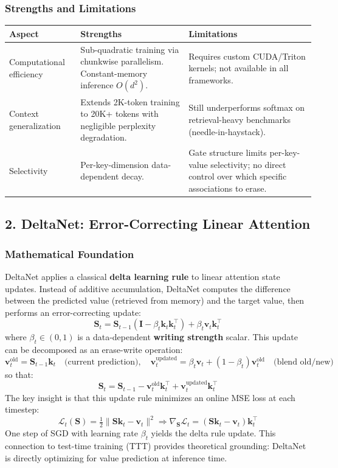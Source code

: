 \documentclass[11pt,a4paper]{article}
\begin{document}
\subsubsection{Strengths and Limitations}

\begin{table}[H]
\centering
\small
\begin{tabularx}{0.95\linewidth}{Xp{4cm}p{4cm}}
\toprule
\textbf{Aspect} & \textbf{Strengths} & \textbf{Limitations} \\
\midrule
Computational efficiency & Sub-quadratic training via chunkwise parallelism. Constant-memory inference $O(d^2)$. & Requires custom CUDA/Triton kernels; not available in all frameworks. \\
Context generalization & Extends 2K-token training to 20K+ tokens with negligible perplexity degradation. & Still underperforms softmax on retrieval-heavy benchmarks (needle-in-haystack). \\
Selectivity & Per-key-dimension data-dependent decay. & Gate structure limits per-key-value selectivity; no direct control over which specific associations to erase. \\
\bottomrule
\end{tabularx}
\end{table}

\subsection{2. DeltaNet: Error-Correcting Linear Attention}

\subsubsection{Mathematical Foundation}

DeltaNet \citep{yang_deltanet_2024} applies a classical \textbf{delta learning rule} to linear attention state updates. Instead of additive accumulation, DeltaNet computes the difference between the predicted value (retrieved from memory) and the target value, then performs an error-correcting update:
\[
\mathbf{S}_t = \mathbf{S}_{t-1}(\mathbf{I} - \beta_t \mathbf{k}_t \mathbf{k}_t^\top) + \beta_t \mathbf{v}_t \mathbf{k}_t^\top
\]
where $\beta_t \in (0,1)$ is a data-dependent \textbf{writing strength} scalar. This update can be decomposed as an erase-write operation:
\[
\mathbf{v}_t^\text{old} = \mathbf{S}_{t-1} \mathbf{k}_t \quad \text{(current prediction)}, \quad
\mathbf{v}_t^\text{updated} = \beta_t \mathbf{v}_t + (1-\beta_t)\mathbf{v}_t^\text{old} \quad \text{(blend old/new)}
\]
so that:
\[
\mathbf{S}_t = \mathbf{S}_{t-1} - \mathbf{v}_t^\text{old}\mathbf{k}_t^\top + \mathbf{v}_t^\text{updated}\mathbf{k}_t^\top
\]
The key insight is that this update rule minimizes an online MSE loss at each timestep:
\[
\mathcal{L}_t(\mathbf{S}) = \tfrac{1}{2}\|\mathbf{S}\mathbf{k}_t - \mathbf{v}_t\|^2 \Rightarrow \nabla_{\mathbf{S}} \mathcal{L}_t = (\mathbf{S}\mathbf{k}_t - \mathbf{v}_t)\mathbf{k}_t^\top
\]
One step of SGD with learning rate $\beta_t$ yields the delta rule update. This connection to test-time training (TTT) provides theoretical grounding: DeltaNet is directly optimizing for value prediction at inference time.
\end{document}
